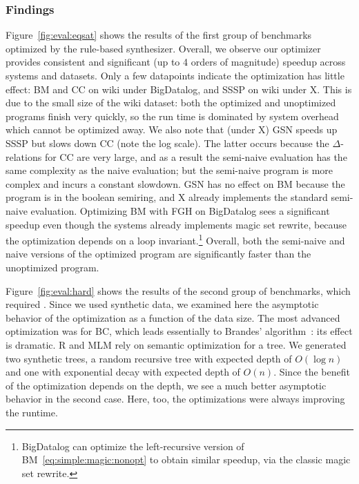     
    \subsubsection{Findings} Figure~\ref{fig:eval:eqsat} shows the results
    of the first group of benchmarks optimized by the
    rule-based synthesizer.  Overall, we observe our optimizer provides
    consistent and significant (up to 4 orders of magnitude) speedup across
    systems and datasets.  Only a few datapoints indicate the optimization
    has little effect: BM and CC on wiki under BigDatalog, and SSSP on
    wiki under X.  This is due to the small size of the wiki dataset: both
    the optimized and unoptimized programs finish very quickly, so the run
    time is dominated by system overhead which cannot be optimized away.
    We also note that (under X) GSN speeds up SSSP but slows down CC (note the log scale).
    The latter occurs because the $\Delta$-relations for CC are very large,
    and as a result the semi-naive evaluation has the same complexity as
    the naive evaluation; but the semi-naive program is more complex and
    incurs a constant slowdown.  GSN has no effect on BM because the
    program is in the boolean semiring, and X already implements the
    standard semi-naive evaluation.
    Optimizing BM with FGH on BigDatalog sees a significant speedup even though the
    systems already implements magic set rewrite,
    because the optimization depends on a loop invariant.\footnote{
    BigDatalog can optimize the left-recursive version of BM~\eqref{eq:simple:magic:nonopt}
    to obtain similar speedup, via the classic magic set rewrite.}
    Overall, both the semi-naive and
    naive versions of the optimized program are significantly faster than
    the unoptimized program.
    
    Figure~\ref{fig:eval:hard} shows the results of the second group of
    benchmarks, which required \cegis.  Since we used synthetic data,  we
    examined here the asymptotic behavior of the optimization as a
    function of the data size.
    The most advanced optimization was for BC, which leads essentially to
    Brandes' algorithm~\cite{brandes2001faster}: its effect is dramatic.
    R and MLM rely on semantic optimization for a tree.  We generated two
    synthetic trees, a random recursive tree with expected depth of
    $O(\log n)$ and one with exponential decay with expected depth of
    $O(n)$.  Since the benefit of the optimization depends on the depth,
    we see a much better asymptotic behavior in the second case.  Here,
    too, the optimizations were always improving the runtime.
    
